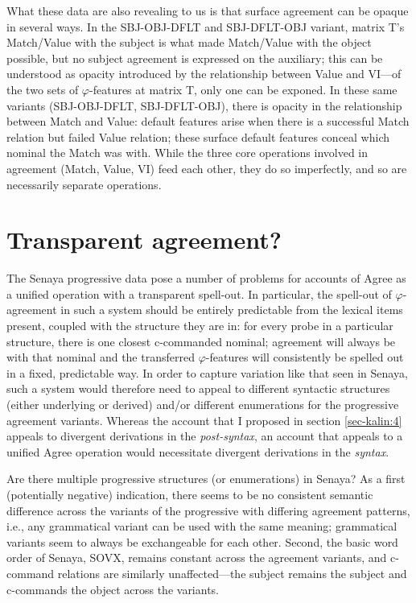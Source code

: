\documentclass[output=paper
,modfonts
,nonflat]{langsci/langscibook}
\begin{document}
What these data are also revealing to us is that surface agreement can be opaque in several ways. In the SBJ-OBJ-DFLT  and SBJ-DFLT-OBJ variant, matrix T's Match/Value with the subject is what made Match/Value with the object possible, but no subject agreement is expressed on the auxiliary; this can be understood as opacity introduced by the relationship between Value and VI---of the two sets of $\varphi$-features at matrix T, only one can be exponed. In these same variants (SBJ-OBJ-DFLT, SBJ-DFLT-OBJ), there is opacity in the relationship between Match and Value: default features arise when there is a successful Match relation but failed Value relation; these surface default features conceal which nominal the Match was with. While the three core operations involved in agreement (Match, Value, VI) feed each other, they do so imperfectly, and so are necessarily separate operations.

\section{Transparent agreement?} \label{sec-kalin:5}

The Senaya progressive data pose a number of problems for accounts of Agree as a unified operation with a transparent spell-out. In particular, the spell-out of $\varphi$-agreement in such a system should be entirely predictable from the lexical items present, coupled with the structure they are in: for every probe in a particular structure, there is one closest c-commanded nominal; agreement will always be with that nominal and the transferred $\varphi$-features will consistently be spelled out in a fixed, predictable way. In order to capture variation like that seen in Senaya, such a system would therefore need to appeal to different syntactic structures (either underlying or derived) and/or different enumerations for the progressive agreement variants. Whereas the account that I proposed in section \ref{sec-kalin:4} appeals to divergent derivations in the \textit{post-syntax}, an account that appeals to a unified Agree operation would necessitate divergent derivations in the \textit{syntax}.

Are there multiple progressive structures (or enumerations) in Senaya? As a first (potentially negative) indication, there seems to be no consistent semantic difference  across the variants of the progressive with differing agreement patterns, i.e., any grammatical variant can be used with the same meaning; grammatical variants seem to always be exchangeable for each other. Second, the basic word order of Senaya, SOVX, remains constant across the agreement variants, and c-command relations are similarly unaffected---the subject remains the subject and c-commands the object across the variants.
\end{document}
